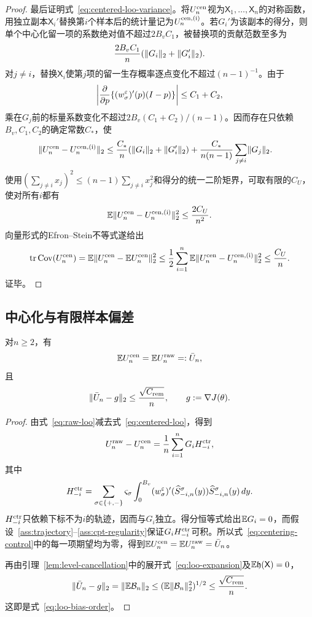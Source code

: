 \begin{proof}
最后证明式~\eqref{eq:centered-loo-variance}。将$U_n^{\rm cen}$视为$\mathsf X_1,\ldots,\mathsf X_n$的对称函数，用独立副本$\mathsf X_i'$替换第$i$个样本后的统计量记为$U_n^{\rm cen,(i)}$。若$G_i'$为该副本的得分，则单个中心化留一项的系数绝对值不超过$2B_vC_1$，被替换项的贡献范数至多为
\[
 \frac{2B_vC_1}{n}(\lVert G_i\rVert_2+\lVert G_i'\rVert_2).
\]
对$j\ne i$，替换$\mathsf X_i$使第$j$项的留一生存概率逐点变化不超过$(n-1)^{-1}$。由于
\[
 \left|\frac{\partial}{\partial p}\{(w_\sigma^\varepsilon)'(p)(I-p)\}\right|
 \le C_1+C_2,
\]
乘在$G_j$前的标量系数变化不超过$2B_v(C_1+C_2)/(n-1)$。因而存在只依赖$B_v,C_1,C_2$的确定常数$C_*$，使
\begin{align*}
 \lVert U_n^{\rm cen}-U_n^{\rm cen,(i)}\rVert_2
 &\le \frac{C_*}{n}(\lVert G_i\rVert_2+\lVert G_i'\rVert_2)
 +\frac{C_*}{n(n-1)}\sum_{j\ne i}\lVert G_j\rVert_2.
\end{align*}
使用$(\sum_{j\ne i}x_j)^2\le(n-1)\sum_{j\ne i}x_j^2$和得分的统一二阶矩界，可取有限的$C_U$，使对所有$i$都有
\[
 \mathbb E\lVert U_n^{\rm cen}-U_n^{\rm cen,(i)}\rVert_2^2
 \le\frac{2C_U}{n^2}.
\]
向量形式的Efron--Stein不等式遂给出
\[
 \operatorname{tr}\operatorname{Cov}(U_n^{\rm cen})
 =\mathbb E\lVert U_n^{\rm cen}-\mathbb E U_n^{\rm cen}\rVert_2^2
 \le\frac12\sum_{i=1}^{n}
 \mathbb E\lVert U_n^{\rm cen}-U_n^{\rm cen,(i)}\rVert_2^2
 \le\frac{C_U}{n}.
\]
证毕。
\end{proof}

\subsection{中心化与有限样本偏差}

\begin{lemma}[中心化与有限样本偏差]\label{lem:centering-expectation}
对$n\ge2$，有
\begin{equation}\label{eq:centered-raw-mean}
 \mathbb E U_n^{\rm cen}=\mathbb E U_n^{\rm raw}=: \bar U_n,
\end{equation}
且
\begin{equation}\label{eq:loo-bias-order}
 \lVert\bar U_n-g\rVert_2\le \frac{\sqrt{C_{\rm rem}}}{n},
 \qquad g:=\nabla J(\theta).
\end{equation}
\end{lemma}

\begin{proof}
由式~\eqref{eq:raw-loo}减去式~\eqref{eq:centered-loo}，得到
\begin{equation}\label{eq:centering-control}
 U_n^{\rm raw}-U_n^{\rm cen}
 =\frac1n\sum_{i=1}^{n}G_i H_{-i}^{\rm ctr},
\end{equation}
其中
\[
 H_{-i}^{\rm ctr}
 =\sum_{\sigma\in\{+,-\}}\varsigma_\sigma
 \int_0^{B_v}
 (w_\sigma^\varepsilon)'(\widehat S_{-i,n}^\sigma(y))
 \widehat S_{-i,n}^\sigma(y)\,dy.
\]
$H_{-i}^{\rm ctr}$只依赖下标不为$i$的轨迹，因而与$G_i$独立。得分恒等式给出$\mathbb E G_i=0$，而假设~\ref{ass:trajectory}--\ref{ass:cpt-regularity}保证$G_iH_{-i}^{\rm ctr}$可积。所以式~\eqref{eq:centering-control}中的每一项期望均为零，得到$\mathbb E U_n^{\rm cen}=\mathbb E U_n^{\rm raw}=\bar U_n$。

再由引理~\ref{lem:level-cancellation}中的展开式~\eqref{eq:loo-expansion}及$\mathbb E\mathfrak h(\mathsf X)=0$，
\[
 \lVert\bar U_n-g\rVert_2
 =\lVert\mathbb E \mathcal B_n\rVert_2
 \le(\mathbb E\lVert\mathcal B_n\rVert_2^2)^{1/2}
 \le\frac{\sqrt{C_{\rm rem}}}{n}.
\]
这即是式~\eqref{eq:loo-bias-order}。
\end{proof}

